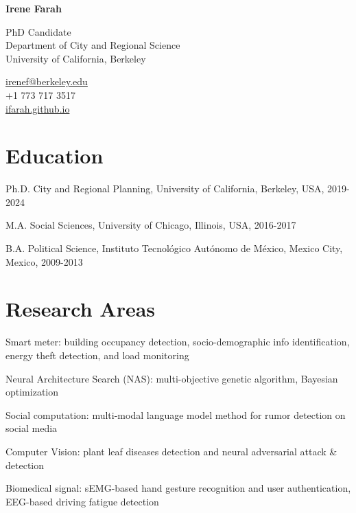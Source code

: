 \documentclass[12pt,letterpaper]{report}
\newcommand{\myname}{Irene Farah}
\newcommand{\namefont}[1]{{\normalfont\bfseries\Huge{#1}}}
\newcommand{\listitemspace}{0.25em}
\renewenvironment{itemize}
{\begin{list}{}{\setlength{\leftmargin}{0em}
                \setlength{\parskip}{0em}
                \setlength{\itemsep}{\listitemspace}
                \setlength{\parsep}{\listitemspace}}}
{\end{list}}
\begin{document}
    \raggedright{}

    \namefont{\myname}

    \vspace{1em}
    \begin{minipage}[t]{0.700\textwidth}
        PhD Candidate \\
        Department of City and Regional Science \\
        University of California, Berkeley
    \end{minipage}
    \begin{minipage}[t]{0.295\textwidth}
        \flushright{}
        \href{mailto:irenef@berkeley.edu}{irenef@berkeley.edu} \\
        +1 773 717 3517 \\
        \href{https://ifarah.github.io}{ifarah.github.io}\\
    \end{minipage}

    \section*{Education}
    
    \begin{tablist}
      \item[Ph.D.] \tab{}City and Regional Planning, University of California, Berkeley, USA, 2019-2024
      \item[M.A.] \tab{}Social Sciences, University of Chicago, Illinois, USA, 2016-2017
      \item[B.A.] \tab{}Political Science, Instituto Tecnológico Autónomo de México, Mexico City, Mexico, 2009-2013
    \end{tablist}
    
    \section*{Research Areas}
    \begin{itemize}
      \item Smart meter: building occupancy detection, socio-demographic info identification, energy theft detection, and load monitoring
      \item Neural Architecture Search (NAS): multi-objective genetic algorithm, Bayesian optimization
      \item Social computation: multi-modal language model method for rumor detection on social media
      \item Computer Vision: plant leaf diseases detection and neural adversarial attack \& detection
      \item Biomedical signal: sEMG-based hand gesture recognition and user authentication, EEG-based driving fatigue detection
    \end{itemize}
    
\end{document}
